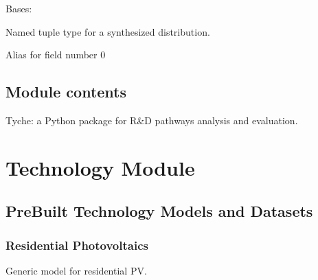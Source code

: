 \documentclass[letterpaper,10pt,english]{sphinxmanual}
\begin{document}
\begin{fulllineitems}
\label{\detokenize{tyche:tyche.Types.SynthesizedDistribution}}
\pysigstartsignatures
{}
\pysigstopsignatures
\sphinxAtStartPar
Bases: 

\sphinxAtStartPar
Named tuple type for a synthesized distribution.

\begin{fulllineitems}
\label{\detokenize{tyche:tyche.Types.SynthesizedDistribution.rvs}}
\pysigstartsignatures
{}
\pysigstopsignatures
\sphinxAtStartPar
Alias for field number 0

\end{fulllineitems}


\end{fulllineitems}



\subsection{Module contents}
\label{\detokenize{tyche:module-tyche}}\label{\detokenize{tyche:module-contents}}
\sphinxAtStartPar
Tyche: a Python package for R\&D pathways analysis and evaluation.

\sphinxstepscope


\section{Technology Module}
\label{\detokenize{technology:technology-module}}\label{\detokenize{technology:sec-technologymodule}}\label{\detokenize{technology::doc}}

\subsection{Pre\sphinxhyphen{}Built Technology Models and Datasets}
\label{\detokenize{technology:pre-built-technology-models-and-datasets}}

\subsubsection{Residential Photovoltaics}
\label{\detokenize{technology:module-technology.pv_residential_large}}\label{\detokenize{technology:residential-photovoltaics}}
\sphinxAtStartPar
Generic model for residential PV.
\end{document}
